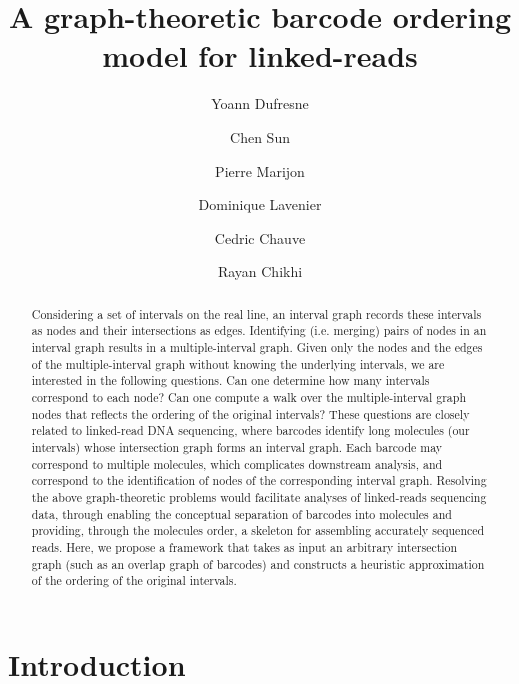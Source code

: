 \documentclass[a4paper,UKenglish,cleveref, autoref, thm-restate,authorcolumns]{lipics-v2019}
\title{A graph-theoretic barcode ordering model for linked-reads}
\author{Yoann Dufresne}{Department of Computational Biology, C3BI USR 3756 CNRS, Institut Pasteur, Paris, France}{yoann.dufresne@pasteur.fr}{https://orcid.org/0000-0002-0930-8920}{}%
\author{Chen Sun}{Department of Computer Science and Engineering, The Pennsylvania State University, USA}{chensunx@gmail.com}{}{}
\author{Pierre Marijon}{Center for Bioinformatics, Saarland University, Saarland Informatics Campus E2.1, 66123 Saarbrücken, Germany}{pmarijon@mmci.uni-saarland.de}{https://orcid.org/0000-0002-6694-6873}{}
\author{Dominique Lavenier}{IRISA, Inria, Universit\'e de Rennes, France}{lavenier@irisa.fr}{https://orcid.org/0000-0003-2557-680X}{}
\author{Cedric Chauve}{Department of Mathematics, Simon Fraser University, Canada \and LaBRI, Universit\'e de Bordeaux, France}{cedric.chauve@sfu.ca}{[orcid]}{NSERC Discovery Grant RGPIN-03986}
\author{Rayan Chikhi}{Department of Computational Biology, C3BI USR 3756 CNRS, Institut Pasteur, Paris, France}{rayan.chikhi@pasteur.fr}{https://orcid.org/0000-0003-1099-8735}{INCEPTION project (PIA/ANR-16-CONV-0005)}
\begin{document}
\maketitle

\begin{abstract}
Considering a set of intervals on the real line, an interval graph records these intervals as nodes and their intersections as edges. Identifying (i.e. merging) pairs of nodes in an interval graph results in a multiple-interval graph. 
Given only the nodes and the edges of the multiple-interval graph without knowing the underlying intervals, we are interested in the following questions. Can one determine how many intervals correspond to each node? Can one compute a walk over the multiple-interval graph nodes that reflects the ordering of the original intervals? These questions are closely related to linked-read DNA sequencing, where barcodes identify long molecules (our intervals) whose intersection graph forms an interval graph. %
Each barcode may correspond to multiple molecules, which complicates downstream analysis, and correspond to the identification of nodes of the corresponding interval graph. %
Resolving the above graph-theoretic problems would facilitate analyses of linked-reads sequencing data, through enabling the conceptual separation of barcodes into molecules and providing, through the molecules order, a skeleton for assembling accurately sequenced reads. Here, we propose a framework that takes as input an arbitrary intersection graph (such as an overlap graph of barcodes) and constructs a heuristic approximation of the ordering of the original intervals.
\end{abstract}

\section{Introduction}
\label{sec:introduction}
\end{document}
